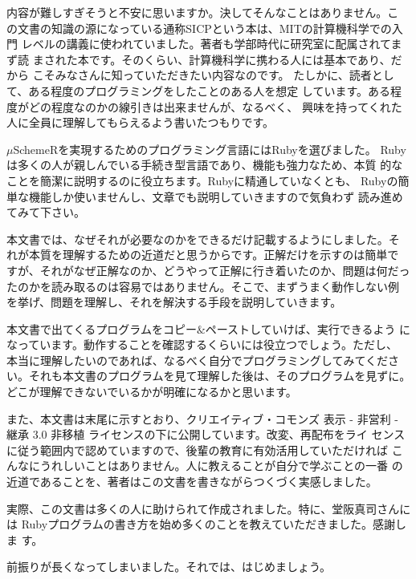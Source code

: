 内容が難しすぎそうと不安に思いますか。決してそんなことはありません。こ
の文書の知識の源になっている通称SICPという本は、MITの計算機科学での入門
レベルの講義に使われていました。著者も学部時代に研究室に配属されてまず読
まされた本です。そのくらい、計算機科学に携わる人には基本であり、だから
こそみなさんに知っていただきたい内容なのです。
たしかに、読者として、ある程度のプログラミングをしたことのある人を想定
しています。ある程度がどの程度なのかの線引きは出来ませんが、なるべく、
興味を持ってくれた人に全員に理解してもらえるよう書いたつもりです。

$\mu$SchemeRを実現するためのプログラミング言語にはRubyを選びました。
Rubyは多くの人が親しんでいる手続き型言語であり、機能も強力なため、本質
的なことを簡潔に説明するのに役立ちます。Rubyに精通していなくとも、
Rubyの簡単な機能しか使いませんし、文章でも説明していきますので気負わず
読み進めてみて下さい。

本文書では、なぜそれが必要なのかをできるだけ記載するようにしました。そ
れが本質を理解するための近道だと思うからです。正解だけを示すのは簡単で
すが、それがなぜ正解なのか、どうやって正解に行き着いたのか、問題は何だっ
たのかを読み取るのは容易ではありません。そこで、まずうまく動作しない例
を挙げ、問題を理解し、それを解決する手段を説明していきます。

本文書で出てくるプログラムをコピー$\&$ペーストしていけば、実行できるよう
になっています。動作することを確認するくらいには役立つでしょう。ただし、
本当に理解したいのであれば、なるべく自分でプログラミングしてみてくださ
い。それも本文書のプログラムを見て理解した後は、そのプログラムを見ずに。
どこが理解できないでいるかが明確になるかと思います。

また、本文書は末尾に示すとおり、クリエイティブ・コモンズ 表示 - 非営利
- 継承 3.0 非移植 ライセンスの下に公開しています。改変、再配布をライ
センスに従う範囲内で認めていますので、後輩の教育に有効活用していただければ
こんなにうれしいことはありません。人に教えることが自分で学ぶことの一番
の近道であることを、著者はこの文書を書きながらつくづく実感しました。

実際、この文書は多くの人に助けられて作成されました。特に、堂阪真司さんには
Rubyプログラムの書き方を始め多くのことを教えていただきました。感謝しま
す。

前振りが長くなってしまいました。それでは、はじめましょう。
